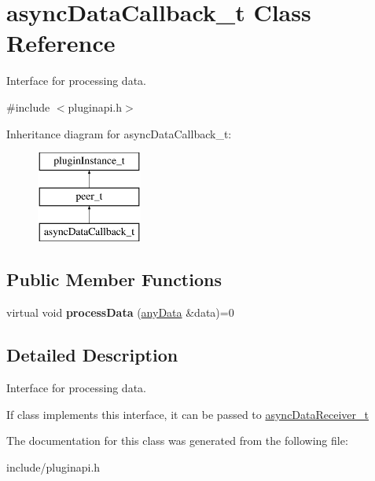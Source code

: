 \hypertarget{classasyncDataCallback__t}{\section{async\-Data\-Callback\-\_\-t \-Class \-Reference}
\label{classasyncDataCallback__t}
}


\-Interface for processing data.  




{\ttfamily \#include $<$pluginapi.\-h$>$}

\-Inheritance diagram for async\-Data\-Callback\-\_\-t\-:\begin{figure}[H]
\begin{center}
\leavevmode
\includegraphics[height=3.000000cm]{classasyncDataCallback__t}
\end{center}
\end{figure}
\subsection*{\-Public \-Member \-Functions}
\begin{DoxyCompactItemize}
\item 
\hypertarget{classasyncDataCallback__t_a5ad1ae3e1d7597821cbc1a7ac4ad521e}{virtual void {\bfseries process\-Data} (\hyperlink{structanyData}{any\-Data} \&data)=0}\label{classasyncDataCallback__t_a5ad1ae3e1d7597821cbc1a7ac4ad521e}

\end{DoxyCompactItemize}


\subsection{\-Detailed \-Description}
\-Interface for processing data. 

\-If class implements this interface, it can be passed to \hyperlink{classasyncDataReceiver__t}{async\-Data\-Receiver\-\_\-t} 

\-The documentation for this class was generated from the following file\-:\begin{DoxyCompactItemize}
\item 
include/pluginapi.\-h\end{DoxyCompactItemize}
